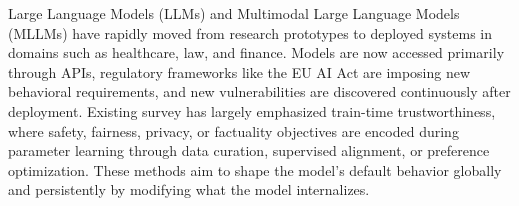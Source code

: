 

Large Language Models (LLMs) and Multimodal Large Language Models (MLLMs) have rapidly moved from research prototypes to deployed systems in domains such as healthcare, law, and finance. Models are now accessed primarily through APIs, regulatory frameworks like the EU AI Act are imposing new behavioral requirements, and new vulnerabilities are discovered continuously after deployment. Existing survey has largely emphasized train-time trustworthiness, where safety, fairness, privacy, or factuality objectives are encoded during parameter learning through data curation, supervised alignment, or preference optimization. These methods aim to shape the model’s default behavior globally and persistently by modifying what the model internalizes.

